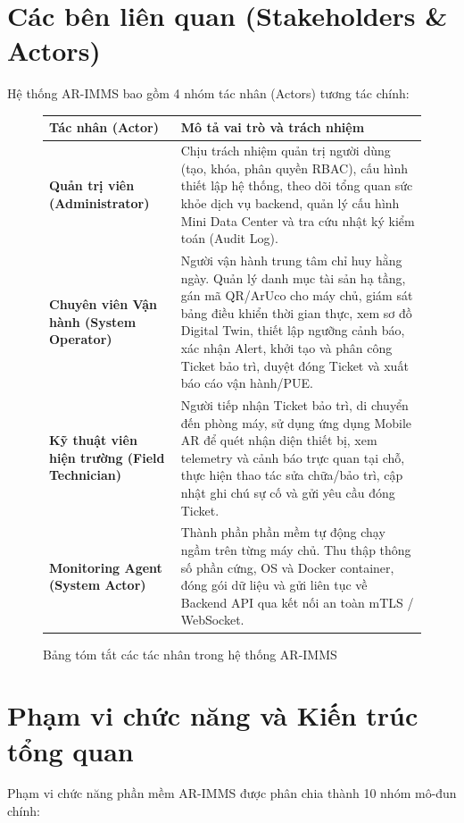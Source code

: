 \section{Các bên liên quan (Stakeholders \& Actors)}
Hệ thống AR-IMMS bao gồm 4 nhóm tác nhân (Actors) tương tác chính:

\begin{figure}[H]
    \centering
    \begin{tabular}{|p{3.5cm}|p{11cm}|}
    \hline
    \textbf{Tác nhân (Actor)} & \textbf{Mô tả vai trò và trách nhiệm} \\ \hline
    \textbf{Quản trị viên (Administrator)} & Chịu trách nhiệm quản trị người dùng (tạo, khóa, phân quyền RBAC), cấu hình thiết lập hệ thống, theo dõi tổng quan sức khỏe dịch vụ backend, quản lý cấu hình Mini Data Center và tra cứu nhật ký kiểm toán (Audit Log). \\ \hline
    \textbf{Chuyên viên Vận hành (System Operator)} & Người vận hành trung tâm chỉ huy hằng ngày. Quản lý danh mục tài sản hạ tầng, gán mã QR/ArUco cho máy chủ, giám sát bảng điều khiển thời gian thực, xem sơ đồ Digital Twin, thiết lập ngưỡng cảnh báo, xác nhận Alert, khởi tạo và phân công Ticket bảo trì, duyệt đóng Ticket và xuất báo cáo vận hành/PUE. \\ \hline
    \textbf{Kỹ thuật viên hiện trường (Field Technician)} & Người tiếp nhận Ticket bảo trì, di chuyển đến phòng máy, sử dụng ứng dụng Mobile AR để quét nhận diện thiết bị, xem telemetry và cảnh báo trực quan tại chỗ, thực hiện thao tác sửa chữa/bảo trì, cập nhật ghi chú sự cố và gửi yêu cầu đóng Ticket. \\ \hline
    \textbf{Monitoring Agent (System Actor)} & Thành phần phần mềm tự động chạy ngầm trên từng máy chủ. Thu thập thông số phần cứng, OS và Docker container, đóng gói dữ liệu và gửi liên tục về Backend API qua kết nối an toàn mTLS / WebSocket. \\ \hline
    \end{tabular}
    \caption{Bảng tóm tắt các tác nhân trong hệ thống AR-IMMS}
\end{figure}

\section{Phạm vi chức năng và Kiến trúc tổng quan}
Phạm vi chức năng phần mềm AR-IMMS được phân chia thành 10 nhóm mô-đun chính:

